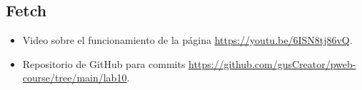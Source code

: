\documentclass{article}
\begin{document}
 \subsection{Fetch}
 
  \begin{itemize}
    \item Video sobre el funcionamiento de la página \url{https://youtu.be/6ISN8tj86vQ}.
    \item Repositorio de GitHub para commits \url{https://github.com/gusCreator/pweb-course/tree/main/lab10}.
  \end{itemize}

\clearpage
	
%
%
%
			
\end{document}
